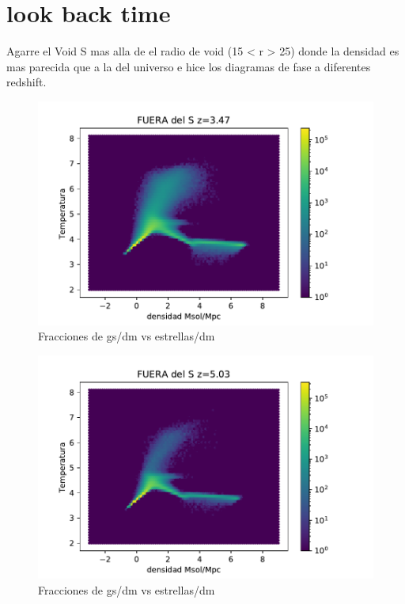 \chapter{look back time}

Agarre el Void S mas alla de el radio de void (15 < r > 25) donde la densidad es mas parecida que a la del universo  e hice los diagramas de fase a diferentes redshift. 

\begin{figure}[h]
\centering
\includegraphics[width=18cm]{Figures/S_df_s25.pdf}
\decoRule
\caption[Fraccione stellar vs gas]{Fracciones de gs/dm vs estrellas/dm }
\label{fig:Electron}
\end{figure}

\begin{figure}[h]
\centering
\includegraphics[width=18cm]{Figures/S_df_s20.pdf}
\decoRule
\caption[Fraccione stellar vs gas]{Fracciones de gs/dm vs estrellas/dm }
\label{fig:Electron}
\end{figure}

